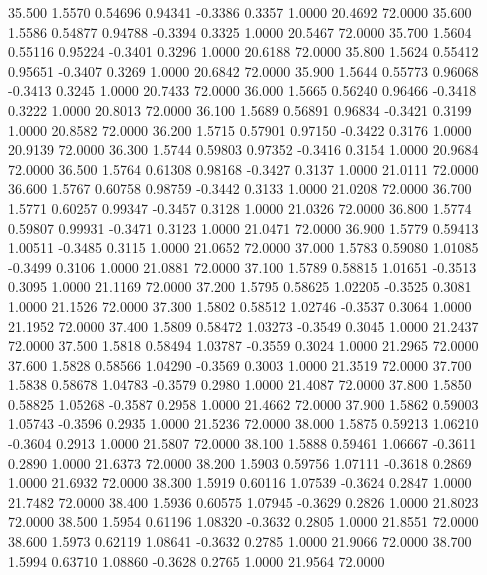   35.500   1.5570   0.54696   0.94341  -0.3386   0.3357   1.0000  20.4692  72.0000
  35.600   1.5586   0.54877   0.94788  -0.3394   0.3325   1.0000  20.5467  72.0000
  35.700   1.5604   0.55116   0.95224  -0.3401   0.3296   1.0000  20.6188  72.0000
  35.800   1.5624   0.55412   0.95651  -0.3407   0.3269   1.0000  20.6842  72.0000
  35.900   1.5644   0.55773   0.96068  -0.3413   0.3245   1.0000  20.7433  72.0000
  36.000   1.5665   0.56240   0.96466  -0.3418   0.3222   1.0000  20.8013  72.0000
  36.100   1.5689   0.56891   0.96834  -0.3421   0.3199   1.0000  20.8582  72.0000
  36.200   1.5715   0.57901   0.97150  -0.3422   0.3176   1.0000  20.9139  72.0000
  36.300   1.5744   0.59803   0.97352  -0.3416   0.3154   1.0000  20.9684  72.0000
  36.500   1.5764   0.61308   0.98168  -0.3427   0.3137   1.0000  21.0111  72.0000
  36.600   1.5767   0.60758   0.98759  -0.3442   0.3133   1.0000  21.0208  72.0000
  36.700   1.5771   0.60257   0.99347  -0.3457   0.3128   1.0000  21.0326  72.0000
  36.800   1.5774   0.59807   0.99931  -0.3471   0.3123   1.0000  21.0471  72.0000
  36.900   1.5779   0.59413   1.00511  -0.3485   0.3115   1.0000  21.0652  72.0000
  37.000   1.5783   0.59080   1.01085  -0.3499   0.3106   1.0000  21.0881  72.0000
  37.100   1.5789   0.58815   1.01651  -0.3513   0.3095   1.0000  21.1169  72.0000
  37.200   1.5795   0.58625   1.02205  -0.3525   0.3081   1.0000  21.1526  72.0000
  37.300   1.5802   0.58512   1.02746  -0.3537   0.3064   1.0000  21.1952  72.0000
  37.400   1.5809   0.58472   1.03273  -0.3549   0.3045   1.0000  21.2437  72.0000
  37.500   1.5818   0.58494   1.03787  -0.3559   0.3024   1.0000  21.2965  72.0000
  37.600   1.5828   0.58566   1.04290  -0.3569   0.3003   1.0000  21.3519  72.0000
  37.700   1.5838   0.58678   1.04783  -0.3579   0.2980   1.0000  21.4087  72.0000
  37.800   1.5850   0.58825   1.05268  -0.3587   0.2958   1.0000  21.4662  72.0000
  37.900   1.5862   0.59003   1.05743  -0.3596   0.2935   1.0000  21.5236  72.0000
  38.000   1.5875   0.59213   1.06210  -0.3604   0.2913   1.0000  21.5807  72.0000
  38.100   1.5888   0.59461   1.06667  -0.3611   0.2890   1.0000  21.6373  72.0000
  38.200   1.5903   0.59756   1.07111  -0.3618   0.2869   1.0000  21.6932  72.0000
  38.300   1.5919   0.60116   1.07539  -0.3624   0.2847   1.0000  21.7482  72.0000
  38.400   1.5936   0.60575   1.07945  -0.3629   0.2826   1.0000  21.8023  72.0000
  38.500   1.5954   0.61196   1.08320  -0.3632   0.2805   1.0000  21.8551  72.0000
  38.600   1.5973   0.62119   1.08641  -0.3632   0.2785   1.0000  21.9066  72.0000
  38.700   1.5994   0.63710   1.08860  -0.3628   0.2765   1.0000  21.9564  72.0000
